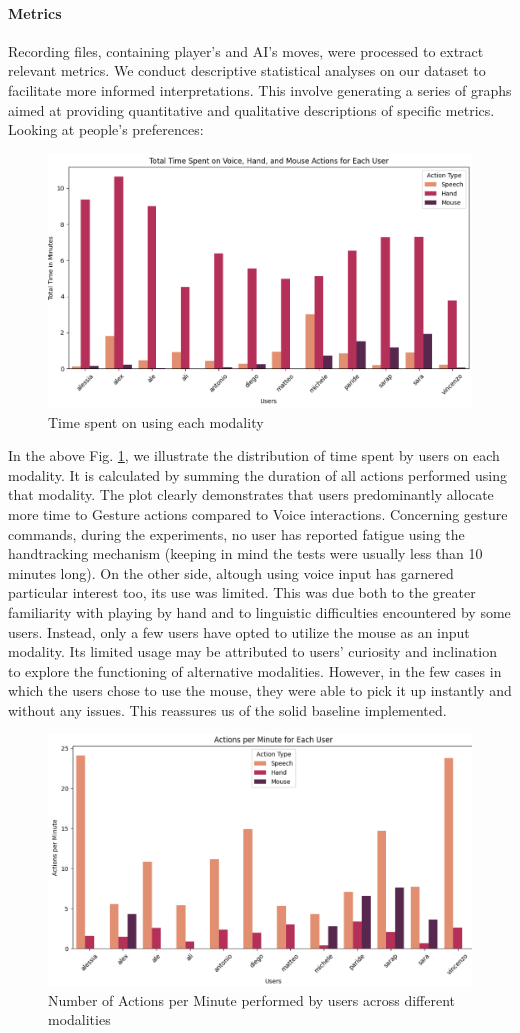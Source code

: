 \documentclass[a4paper, 11pt, twocolumn]{IEEEtran}
\begin{document}
    \paragraph*{Metrics} Recording files, containing player's and AI's moves, were processed to extract relevant metrics. We conduct descriptive statistical analyses on our dataset to facilitate more informed interpretations. This involve generating a series of graphs aimed at providing quantitative and qualitative descriptions of specific metrics. \\ Looking at people's preferences:
    \begin{figure}
        \centering
        \includegraphics[width=.5\textwidth]{images/total_time.png}
        \caption{Time spent on using each modality}
        \label{fig:histplot_timespent}
    \end{figure}
    In the above Fig. \ref{fig:histplot_timespent}, we illustrate the distribution of time spent by users on each modality. It is calculated by summing the duration of all actions performed using that modality. The plot clearly demonstrates that users predominantly allocate more time to Gesture actions compared to Voice interactions. Concerning gesture commands, during the experiments, no user has reported fatigue using the handtracking mechanism (keeping in mind the tests were usually less than 10 minutes long). On the other side, altough using voice input has garnered particular interest too, its use was limited. This was due both to the greater familiarity with playing by hand and to linguistic difficulties encountered by some users. Instead, only a few users have opted to utilize the mouse as an input modality. Its limited usage may be attributed to users' curiosity and inclination to explore the functioning of alternative modalities. However, in the few cases in which the users chose to use the mouse, they were able to pick it up instantly and without any issues. This reassures us of the solid baseline implemented. 
    \begin{figure}
        \centering
        \includegraphics[width=.5\textwidth]{images/actions_per_minutes.png}
        \caption{Number of Actions per Minute performed by users across different modalities}
        \label{fig:histplot_actionsperminute}
    \end{figure}
\end{document}
